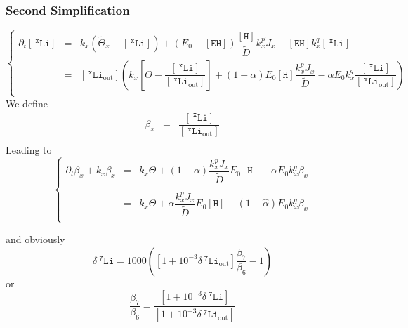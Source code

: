 \documentclass[aps,onecolumn,12pt]{revtex4}
\newcommand{\mychem}[1]{\mathtt{#1}}
\newcommand{\myconc}[1]{\left\lbrack{#1}\right\rbrack}
\newcommand{\spLi}[1]{{~^{\mychem{#1}}\mychem{Li}}}
\newcommand{\Li}[1]{\myconc{\spLi{#1}}}
\newcommand{\spLiOut}[1]{{\spLi{#1}}_{\mathrm{out}}}
\newcommand{\LiOut}[1]{\myconc{\spLiOut{#1}}}
\newcommand{\spEHin}{\mychem{EH}}
\newcommand{\EHin}{\myconc{\spEHin}}
\newcommand{\spproton}{\mychem{H}}
\newcommand{\proton}{\myconc{\spproton}}
\newcommand{\deltaLi}{ {\delta\!\!\!\spLi{7}} }
\newcommand{\deltaLiOut}{{\deltaLi}_{\mathrm{out}}}
\begin{document}
\subsubsection{Second Simplification}
\begin{equation}
\left\lbrace
\begin{array}{rcl}
\partial_t\Li{x} & = & k_x \left(\tilde{\Theta}_x -\Li{x} \right)  + \left(E_0-\EHin\right) \dfrac{\proton}{\tilde{D}}   k_x^p \tilde{J}_x  - \EHin k_x^q \Li{x}\\
 &=&   \LiOut{x} \left( k_x
 	\left[\Theta-\dfrac{\Li{x}}{\LiOut{x}}\right] 
	+ \left(1-\alpha\right) E_0 \proton \dfrac{ k_x^p J_x}{\tilde{D}}
 - \alpha  E_0 k_x^q \dfrac{\Li{x}}{\LiOut{x}} \right) \\
\end{array}
\right.
\end{equation}
We define
\begin{equation}
\begin{array}{rcl}
\beta_x & = & \dfrac{\Li{x}}{\LiOut{x}} \\
\end{array}
\end{equation}
Leading to
\begin{equation}
\left\lbrace
\begin{array}{rcl}
\partial_t \beta_x + k_x \beta_x 
& = & k_x \Theta  + \left(1-\alpha\right) \dfrac{ k_x^p J_x}{\tilde{D}} E_0 \proton  - \alpha E_0 k_x^q \beta_x \\
\\
& = & k_x \Theta  +  \hat\alpha \dfrac{ k_x^p J_x}{\tilde{D}} E_0 \proton  -  \left(1-\hat\alpha\right) E_0 k_x^q \beta_x \\
\end{array}
\right.
\end{equation}

and obviously
\begin{equation}
	\deltaLi = 1000 \left ( \left[1+10^{-3}\deltaLiOut\right] \dfrac{\beta_7}{\beta_6}-1\right)
\end{equation}
or
\begin{equation}
	\dfrac{ \beta_7}{\beta_6} = \dfrac{\left[1+10^{-3}\deltaLi\right]}{\left[1+10^{-3}\deltaLiOut\right]}
\end{equation}
\end{document}
